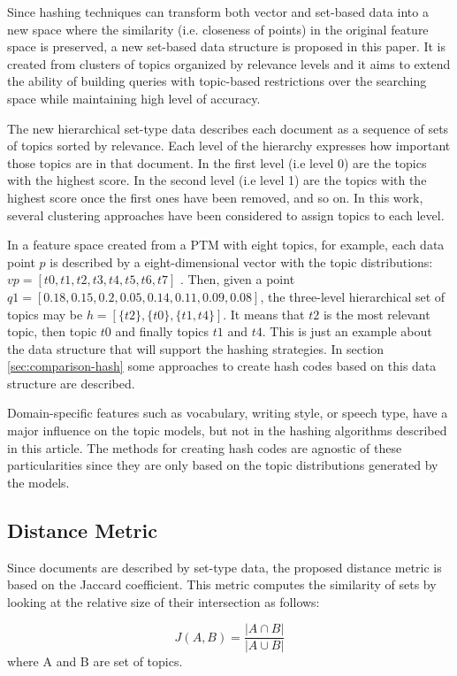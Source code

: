 Since hashing techniques can transform both vector and set-based data \citep{Mao2017, Ji2013} into a new space where the similarity (i.e. closeness of points) in the original feature space is preserved, a new set-based data structure is proposed in this paper. It is created from clusters of topics organized by relevance levels and it aims to extend the ability of building queries with topic-based restrictions over the searching space while maintaining high level of accuracy.

The new hierarchical set-type data describes each document as a sequence of sets of topics sorted by relevance. Each level of the hierarchy expresses how important those topics are in that document. In the first level (i.e level 0) are the topics with the highest score. In the second level (i.e level 1) are the topics with the highest score once the first ones have been removed, and so on. In this work, several clustering approaches have been considered to assign topics to each level.

In a feature space created from a PTM with eight topics, for example, each data point $p$ is described by a eight-dimensional vector with the topic distributions: $vp=[t0,t1,t2,t3,t4,t5,t6,t7]$ . Then, given a point $q1=[0.18, 0.15, 0.2, 0.05, 0.14, 0.11, 0.09, 0.08]$, the three-level hierarchical set of topics may be $h=[\{t2\},\{t0\},\{t1,t4\}]$. It means that $t2$ is the most relevant topic, then topic $t0$ and finally topics $t1$ and $t4$. This is just an example about the data structure that will support the hashing strategies. In section \ref{sec:comparison-hash} some approaches to create hash codes based on this data structure are described.

Domain-specific features such as vocabulary, writing style, or speech type, have a major influence on the topic models, but not in the hashing algorithms described in this article. The methods for creating hash codes are agnostic of these particularities since they are only based on the topic distributions generated by the models. 

\subsection{Distance Metric}
Since documents are described by set-type data, the proposed distance metric is based on the Jaccard coefficient. This metric computes the similarity of sets by looking at the relative size of their intersection as follows:

\begin{equation}
J(A,B) = \frac{ | A \cap B |}{ | A \cup B |}
\label{eq:jc}
\end{equation}
where A and B are set of topics. 

